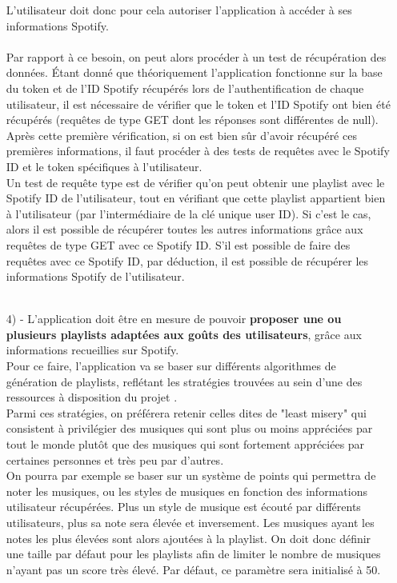 \documentclass[12pt, openany]{report}
\begin{document}
\begin{itemize}
\begin{itemize}
\end{itemize}
L'utilisateur doit donc pour cela autoriser l'application à accéder à ses informations Spotify.
\\
\\
Par rapport à ce besoin, on peut alors procéder à un test de récupération des données. Étant donné que théoriquement l'application fonctionne sur la base du token et de l'ID Spotify récupérés lors de l'authentification de chaque utilisateur, il est nécessaire de vérifier que le token et l'ID Spotify ont bien été récupérés (requêtes de type GET dont les réponses sont différentes de null). Après cette première vérification, si on est bien sûr d'avoir récupéré ces premières informations, il faut procéder à des tests de requêtes avec le Spotify ID et le token spécifiques à l'utilisateur. 
\\
Un test de requête type est de vérifier qu'on peut obtenir une playlist avec le Spotify ID de l'utilisateur, tout en vérifiant que cette playlist appartient bien à l'utilisateur (par l'intermédiaire de la clé unique user ID). Si c'est le cas, alors il est possible de récupérer toutes les autres informations grâce aux requêtes de type GET avec ce Spotify ID. S'il est possible de faire des requêtes avec ce Spotify ID, par déduction, il est possible de récupérer les informations Spotify de l'utilisateur.
\\
\\
\item[4) -] L'application doit être en mesure de pouvoir \textbf{proposer une ou plusieurs playlists adaptées aux goûts des utilisateurs}, grâce aux informations recueillies sur Spotify. 
\\
Pour ce faire, l'application va se baser sur différents algorithmes de génération de playlists, reflétant les stratégies trouvées au sein d'une des ressources à disposition du projet \cite{Algorithme}.
\\
Parmi ces stratégies, on préférera retenir celles dites de "least misery" qui consistent à privilégier des musiques qui sont plus ou moins appréciées par tout le monde plutôt que des musiques qui sont fortement appréciées par certaines personnes et très peu par d'autres.
\\
On pourra par exemple se baser sur un système de points qui permettra de noter les musiques, ou les styles de musiques en fonction des informations utilisateur récupérées. Plus un style de musique est écouté par différents utilisateurs, plus sa note sera élevée et inversement. Les musiques ayant les notes les plus élevées sont alors ajoutées à la playlist. On doit donc définir une taille par défaut pour les playlists afin de limiter le nombre de musiques n'ayant pas un score très élevé. Par défaut, ce paramètre sera initialisé à 50.

\end{itemize}
\end{document}
